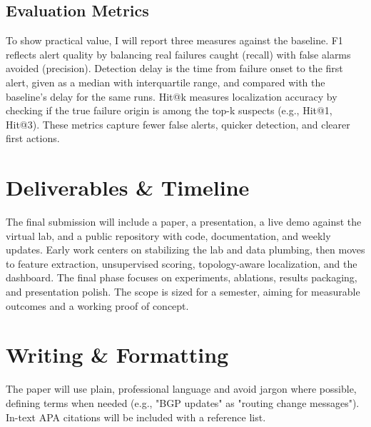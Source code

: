 \documentclass[11pt]{article}
\begin{document}
\subsection{Evaluation Metrics}

To show practical value, I will report three measures against the baseline. F1 reflects alert quality by balancing real failures caught (recall) with false alarms avoided (precision). Detection delay is the time from failure onset to the first alert, given as a median with interquartile range, and compared with the baseline's delay for the same runs. Hit@k measures localization accuracy by checking if the true failure origin is among the top-k suspects (e.g., Hit@1, Hit@3). These metrics capture fewer false alerts, quicker detection, and clearer first actions.

\section{Deliverables \& Timeline}

The final submission will include a paper, a presentation, a live demo against the virtual lab, and a public repository with code, documentation, and weekly updates. Early work centers on stabilizing the lab and data plumbing, then moves to feature extraction, unsupervised scoring, topology-aware localization, and the dashboard. The final phase focuses on experiments, ablations, results packaging, and presentation polish. The scope is sized for a semester, aiming for measurable outcomes and a working proof of concept.

\section{Writing \& Formatting}

The paper will use plain, professional language and avoid jargon where possible, defining terms when needed (e.g., "BGP updates" as "routing change messages"). In-text APA citations will be included with a reference list.



\end{document}
